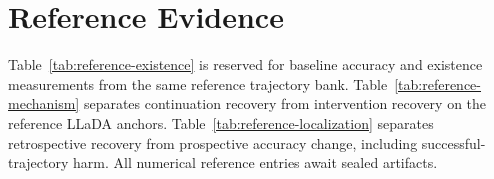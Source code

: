 \section{Reference Evidence}

Table~\ref{tab:reference-existence} is reserved for baseline accuracy and
existence measurements from the same reference trajectory bank.
Table~\ref{tab:reference-mechanism} separates continuation recovery from
intervention recovery on the reference LLaDA anchors.
Table~\ref{tab:reference-localization} separates retrospective recovery from
prospective accuracy change, including successful-trajectory harm.
All numerical reference entries await sealed artifacts.




